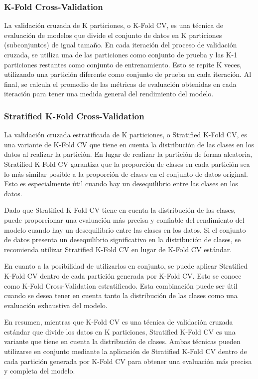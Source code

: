 \subsubsection{K-Fold Cross-Validation}
La validación cruzada de K particiones, o K-Fold CV, es una técnica de evaluación de modelos que divide el conjunto de datos en K particiones (subconjuntos) de igual tamaño. En cada iteración del proceso de validación cruzada, se utiliza una de las particiones como conjunto de prueba y las K-1 particiones restantes como conjunto de entrenamiento. Esto se repite K veces, utilizando una partición diferente como conjunto de prueba en cada iteración. Al final, se calcula el promedio de las métricas de evaluación obtenidas en cada iteración para tener una medida general del rendimiento del modelo.

\subsubsection{Stratified K-Fold Cross-Validation}
La validación cruzada estratificada de K particiones, o Stratified K-Fold CV, es una variante de K-Fold CV que tiene en cuenta la distribución de las clases en los datos al realizar la partición. En lugar de realizar la partición de forma aleatoria, Stratified K-Fold CV garantiza que la proporción de clases en cada partición sea lo más similar posible a la proporción de clases en el conjunto de datos original. Esto es especialmente útil cuando hay un desequilibrio entre las clases en los datos.

Dado que Stratified K-Fold CV tiene en cuenta la distribución de las clases, puede proporcionar una evaluación más precisa y confiable del rendimiento del modelo cuando hay un desequilibrio entre las clases en los datos. Si el conjunto de datos presenta un desequilibrio significativo en la distribución de clases, se recomienda utilizar Stratified K-Fold CV en lugar de K-Fold CV estándar.

En cuanto a la posibilidad de utilizarlos en conjunto, se puede aplicar Stratified K-Fold CV dentro de cada partición generada por K-Fold CV. Esto se conoce como K-Fold Cross-Validation estratificado. Esta combinación puede ser útil cuando se desea tener en cuenta tanto la distribución de las clases como una evaluación exhaustiva del modelo.

En resumen, mientras que K-Fold CV es una técnica de validación cruzada estándar que divide los datos en K particiones, Stratified K-Fold CV es una variante que tiene en cuenta la distribución de clases. Ambas técnicas pueden utilizarse en conjunto mediante la aplicación de Stratified K-Fold CV dentro de cada partición generada por K-Fold CV para obtener una evaluación más precisa y completa del modelo. \cite{dankers2018prediction}

